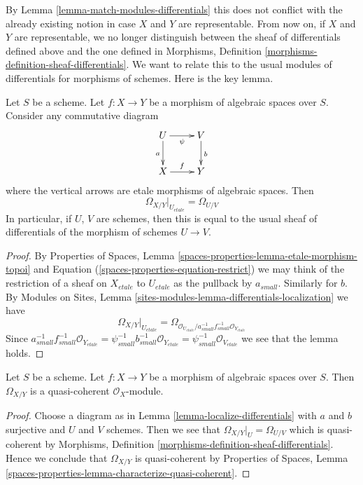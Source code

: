 \noindent
By
Lemma \ref{lemma-match-modules-differentials}
this does not conflict with the already existing
notion in case $X$ and $Y$ are representable. From now on, if $X$ and $Y$
are representable, we no longer distinguish between the sheaf of differentials
defined above and the one defined in
Morphisms, Definition \ref{morphisms-definition-sheaf-differentials}.
We want to relate this to the usual modules of differentials for
morphisms of schemes. Here is the key lemma.

\begin{lemma}
\label{lemma-localize-differentials}
Let $S$ be a scheme. Let $f : X \to Y$ be a morphism of algebraic spaces
over $S$. Consider any commutative diagram
$$
\xymatrix{
U \ar[d]_a \ar[r]_\psi & V \ar[d]^b \\
X \ar[r]^f & Y
}
$$
where the vertical arrows are etale morphisms of algebraic spaces. Then
$$
\Omega_{X/Y}|_{U_{etale}} = \Omega_{U/V}
$$
In particular, if $U$, $V$ are schemes, then this is equal to the usual
sheaf of differentials of the morphism of schemes $U \to V$.
\end{lemma}

\begin{proof}
By
Properties of Spaces, Lemma \ref{spaces-properties-lemma-etale-morphism-topoi}
and Equation (\ref{spaces-properties-equation-restrict})
we may think of the restriction of a sheaf on $X_{etale}$ to
$U_{etale}$ as the pullback by $a_{small}$. Similarly for $b$.
By Modules on Sites, Lemma \ref{sites-modules-lemma-differentials-localization}
we have
$$
\Omega_{X/Y}|_{U_{etale}} =
\Omega_{\mathcal{O}_{U_{etale}}/
a_{small}^{-1}f_{small}^{-1}\mathcal{O}_{Y_{etale}}}
$$
Since $a_{small}^{-1}f_{small}^{-1}\mathcal{O}_{Y_{etale}}
= \psi_{small}^{-1}b_{small}^{-1}\mathcal{O}_{Y_{etale}}
= \psi_{small}^{-1}\mathcal{O}_{V_{etale}}$ we see that the lemma holds.
\end{proof}

\begin{lemma}
\label{lemma-module-differentials-quasi-coherent}
Let $S$ be a scheme. Let $f : X \to Y$ be a morphism of algebraic spaces
over $S$. Then $\Omega_{X/Y}$ is a quasi-coherent $\mathcal{O}_X$-module.
\end{lemma}

\begin{proof}
Choose a diagram as in
Lemma \ref{lemma-localize-differentials}
with $a$ and $b$ surjective and $U$ and $V$ schemes.
Then we see that $\Omega_{X/Y}|_U = \Omega_{U/V}$ which is
quasi-coherent by
Morphisms, Definition \ref{morphisms-definition-sheaf-differentials}.
Hence we conclude that $\Omega_{X/Y}$ is quasi-coherent by
Properties of Spaces,
Lemma \ref{spaces-properties-lemma-characterize-quasi-coherent}.
\end{proof}

